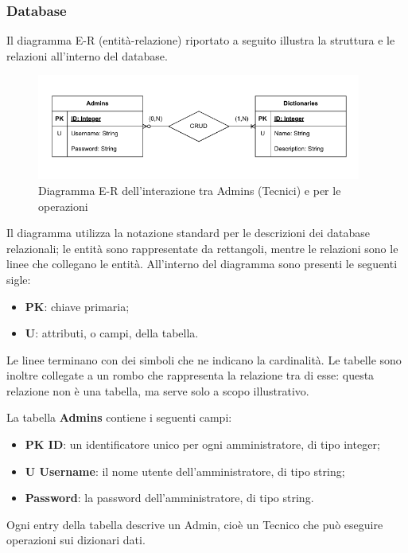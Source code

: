 \subsubsection{Database}

\par Il diagramma E-R (entità-relazione) riportato a seguito illustra la struttura e le relazioni all'interno del database.

\begin{figure}[H]
    \centering
    \includegraphics[width=0.95\textwidth]{assets/Database/DiagrammiDB.png}
    \caption{Diagramma E-R dell'interazione tra Admins (Tecnici) e  per le operazioni }
\end{figure}

\par Il diagramma utilizza la notazione standard per le descrizioni dei database relazionali; le entità sono rappresentate da rettangoli, mentre le relazioni sono le linee che collegano le entità. All'interno del diagramma sono presenti le seguenti sigle:
\begin{itemize}
    \item \textbf{PK}: chiave primaria;
    \item \textbf{U}: attributi, o campi, della tabella.
\end{itemize}

\par Le linee terminano con dei simboli che ne indicano la cardinalità. Le tabelle sono inoltre collegate a un rombo che rappresenta la relazione tra di esse: questa relazione non è una tabella, ma serve solo a scopo illustrativo.

\par La tabella \textbf{Admins} contiene i seguenti campi:
\begin{itemize}
    \item \textbf{PK ID}: un identificatore unico per ogni amministratore, di tipo integer;
    \item \textbf{U Username}: il nome utente dell'amministratore, di tipo string;
    \item \textbf{Password}: la password dell'amministratore, di tipo string.
\end{itemize}
\par Ogni entry della tabella descrive un Admin, cioè un Tecnico che può eseguire operazioni  sui dizionari dati.

